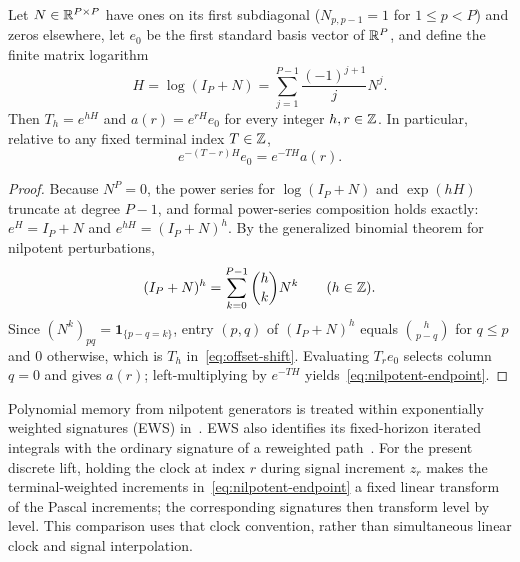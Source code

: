 \begin{proposition}\label{prop:nilpotent}
Let \(N \in \mathbb{R}^{P \times P}\) have ones on its first subdiagonal
(\(N_{p, p-1} = 1\) for \(1 \leq p < P\)) and zeros elsewhere, let \(e_0\) be the
first standard basis vector of \(\mathbb{R}^P\), and define the finite matrix logarithm
\[
 H = \log(I_P + N) = \sum_{j=1}^{P-1} \frac{(-1)^{j+1}}{j} N^j.
\]
Then \(T_h = e^{hH}\) and \(a(r) = e^{rH} e_0\) for every integer \(h, r \in \mathbb{Z}\).
In particular, relative to any fixed terminal index \(T \in \mathbb{Z}\),
\begin{equation}\label{eq:nilpotent-endpoint}
 e^{-(T - r) H} e_0 = e^{-T H} a(r).
\end{equation}
\end{proposition}
\begin{proof}
Because \(N^P = 0\), the power series for \(\log(I_P + N)\) and \(\exp(hH)\)
truncate at degree \(P - 1\), and formal power-series composition holds exactly:
\(e^H = I_P + N\) and \(e^{hH} = (I_P + N)^h\). By the generalized binomial
theorem for nilpotent perturbations,
\[
 (I_P + N)^h = \sum_{k=0}^{P-1} \binom{h}{k} N^k \qquad (h \in \mathbb{Z}).
\]
Since \((N^k)_{pq} = \mathbf 1_{\{p - q = k\}}\), entry \((p, q)\) of
\((I_P + N)^h\) equals \(\binom{h}{p-q}\) for \(q \leq p\) and \(0\) otherwise,
which is \(T_h\) in~\eqref{eq:offset-shift}. Evaluating \(T_r e_0\) selects column
\(q = 0\) and gives \(a(r)\); left-multiplying by \(e^{-TH}\) yields~\eqref{eq:nilpotent-endpoint}.
\end{proof}

Polynomial memory from nilpotent generators is treated within exponentially
weighted signatures (EWS) in~\cite[Prop.~2]{ews}. EWS also identifies its
fixed-horizon iterated integrals with the ordinary signature of a reweighted
path~\cite[Prop.~3]{ews}. For the present discrete lift, holding the clock at
index \(r\) during signal increment \(z_r\) makes the terminal-weighted increments
in~\eqref{eq:nilpotent-endpoint} a fixed linear transform of the Pascal increments;
the corresponding signatures then transform level by level. This comparison
uses that clock convention, rather than simultaneous linear clock and signal
interpolation.

